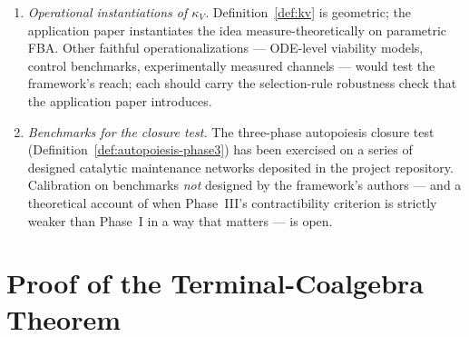 \documentclass[11pt,a4paper]{article}
\theoremstyle{plain}
\theoremstyle{definition}
\theoremstyle{remark}
\newcommand{\kk}{\kappa_{\!V}}
\begin{document}
\begin{enumerate}[leftmargin=*,itemsep=3pt]
$\mathcal K$ rather than merely averaging them). Recovering the
empirical rates analytically is open.
\item \emph{Operational instantiations of $\kk$.}
Definition~\ref{def:kv} is geometric; the application paper
\citep{zai2026measure} instantiates the idea measure-theoretically
on parametric FBA. Other faithful operationalizations --- ODE-level
viability models, control benchmarks, experimentally measured
channels --- would test the framework's reach; each should carry the selection-rule robustness check that the application paper introduces.
\item \emph{Benchmarks for the closure test.} The three-phase
autopoiesis closure test (Definition~\ref{def:autopoiesis-phase3})
has been exercised on a series of designed catalytic maintenance
networks deposited in the project repository. Calibration on
benchmarks \emph{not} designed by the framework's authors --- and a
theoretical account of when Phase~III's contractibility criterion is
strictly weaker than Phase~I in a way that matters --- is open.
\end{enumerate}


\appendix
\section{Proof of the Terminal-Coalgebra Theorem}
\label{app:terminal-coalgebra}
\end{document}
